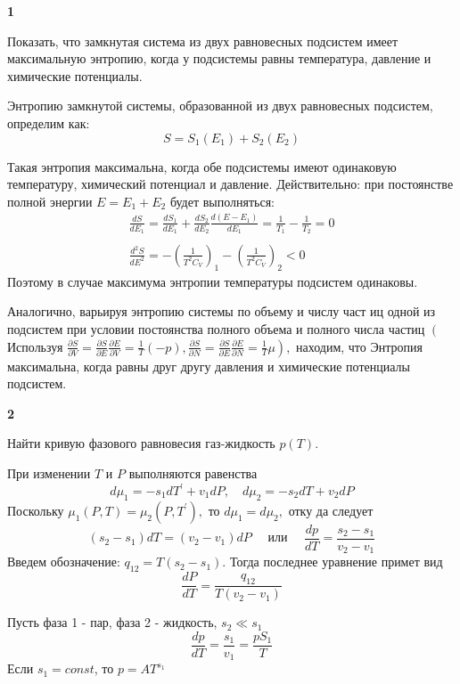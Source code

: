 \documentclass[a4paper,12pt]{article} %
\begin{document}
\begin{ttask}\textbf{1}


Показать, что замкнутая система из двух равновесных подсистем имеет максимальную энтропию, 
когда у подсистемы равны температура, давление и химические потенциалы.


Энтропию замкнутой системы, образованной из двух равновесных подсистем, определим как:
$$
S=S_{1}\left(E_{1}\right)+S_{2}\left(E_{2}\right)
$$


Такая энтропия максимальна, когда обе подсистемы имеют одинаковую температуру, химический потенциал и давление.
Действительно:
при постоянстве полной энергии $E=E_{1}+E_{2}$ будет выполняться:
{\Large $$
	\begin{array}{c}
	\frac{d S}{d E_{1}}=\frac{d S_{1}}{d E_{1}}+\frac{d S_{2}}{d E_{2}} \frac{d\left(E-E_{1}\right)}{d E_{1}}=\frac{1}{T_{1}}-\frac{1}{T_{2}}=0 \\ \\
	\frac{d^{2} S}{d E^{2}}=-\left(\frac{1}{T^{2} C_{V}}\right)_{1}-\left(\frac{1}{T^{2} C_{V}}\right)_{2}<0
	\end{array}
	$$}
Поэтому в случае максимума энтропии температуры подсистем одинаковы.

Аналогично, варьируя энтропию системы по объему и числу част иц одной из подсистем при условии постоянства полного объема и полного числа частиц 
$\left(\right.$ Используя $\left.\frac{\partial S}{\partial V}=
\frac{\partial S}{\partial E} \frac{\partial E}{\partial V}=\frac{1}{T}(-p), \frac{\partial S}{\partial N}=
\frac{\partial S}{\partial E} \frac{\partial E}{\partial N}=
\frac{1}{T} \mu\right),$ находим, что Энтропия
максимальна, когда равны друг другу давления и химические потенциалы подсистем.



\end{ttask}


\begin{ttask} \textbf{2}

Найти кривую фазового равновесия газ-жидкость $ p(T) $.


При изменении $T$ и $P$ выполняются равенства
$$
d \mu_{1}=-s_{1} d T^{\prime}+v_{1} d P, \quad d \mu_{2}=-s_{2} d T+v_{2} d P
$$
Поскольку $\mu_{1}(P, T)=\mu_{2}\left(P, T^{\prime}\right),$ то $d \mu_{1}=d \mu_{2},$ отку да следует
$$
\left(s_{2}-s_{1}\right) d T=\left(v_{2}-v_{1}\right) d P \quad \text { или } \quad \frac{d p}{d T}=\frac{s_{2}-s_{1}}{v_{2}-v_{1}}
$$
Введем обозначение: $q_{12}=T\left(s_{2}-s_{1}\right) .$ Тогда последнее уравнение примет вид
$$
\frac{d P}{d T}=
\frac{q_{12}}{T\left(v_{2}-v_{1}\right)}
$$


Пусть фаза 1 - пар, фаза 2 - жидкость, $ s_2 \ll s_1 $
\[ \frac{d p}{d T}=\frac{s_1}{v_1}=\frac{pS_1}{T} \]
Если $ s_1=const$, то $ p=AT^{s_1} $

\end{ttask}
\end{document}
